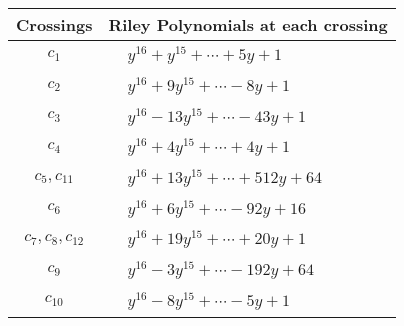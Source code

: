\documentclass[1p]{elsarticle_modified}
\theoremstyle{definition}
\begin{document}
\begin{tabular}{m{50pt}|m{274pt}}
Crossings & \hspace{64pt}Riley Polynomials at each crossing \\
\hline $$\begin{aligned}c_{1}\end{aligned}$$&$\begin{aligned}
&y^{16}+y^{15}+\cdots+5 y+1
\end{aligned}$\\
\hline $$\begin{aligned}c_{2}\end{aligned}$$&$\begin{aligned}
&y^{16}+9 y^{15}+\cdots-8 y+1
\end{aligned}$\\
\hline $$\begin{aligned}c_{3}\end{aligned}$$&$\begin{aligned}
&y^{16}-13 y^{15}+\cdots-43 y+1
\end{aligned}$\\
\hline $$\begin{aligned}c_{4}\end{aligned}$$&$\begin{aligned}
&y^{16}+4 y^{15}+\cdots+4 y+1
\end{aligned}$\\
\hline $$\begin{aligned}c_{5},c_{11}\end{aligned}$$&$\begin{aligned}
&y^{16}+13 y^{15}+\cdots+512 y+64
\end{aligned}$\\
\hline $$\begin{aligned}c_{6}\end{aligned}$$&$\begin{aligned}
&y^{16}+6 y^{15}+\cdots-92 y+16
\end{aligned}$\\
\hline $$\begin{aligned}c_{7},c_{8},c_{12}\end{aligned}$$&$\begin{aligned}
&y^{16}+19 y^{15}+\cdots+20 y+1
\end{aligned}$\\
\hline $$\begin{aligned}c_{9}\end{aligned}$$&$\begin{aligned}
&y^{16}-3 y^{15}+\cdots-192 y+64
\end{aligned}$\\
\hline $$\begin{aligned}c_{10}\end{aligned}$$&$\begin{aligned}
&y^{16}-8 y^{15}+\cdots-5 y+1
\end{aligned}$\\
\hline
\end{tabular}\\~\\
\end{document}
